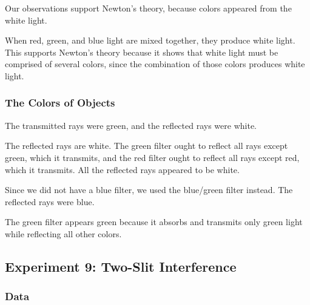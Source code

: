 \documentclass[12pt]{article}
\begin{document}
Our observations support Newton's theory, because colors appeared from the white
light.

\subsubsubsection{}

When red, green, and blue light are mixed together, they produce white
light. This supports Newton's theory because it shows that white light must be
comprised of several colors, since the combination of those colors produces
white light.

\subsubsection{The Colors of Objects}

\subsubsubsection{}

The transmitted rays were green, and the reflected rays were white.

\subsubsubsection{}

The reflected rays are white. The green filter ought to reflect all rays except
green, which it transmits, and the red filter ought to reflect all rays except
red, which it transmits. All the reflected rays appeared to be white.

\subsubsubsection{}

Since we did not have a blue filter, we used the blue/green filter instead. The
reflected rays were blue.

\subsubsubsection{}

The green filter appears green because it absorbs and transmits only green light
while reflecting all other colors.



\subsection{Experiment 9: Two-Slit Interference}

\subsubsection{Data}
\end{document}
